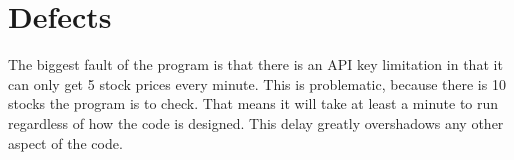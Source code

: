 \documentclass[letterpaper]{article}
\begin{document}
\section{Defects}

The biggest fault of the program is that there is an API key
limitation in that it can only get 5 stock prices every minute. This
is problematic, because there is 10 stocks the program is to
check. That means it will take at least a minute to run regardless of
how the code is designed. This delay greatly overshadows any other
aspect of the code.
\end{document}
